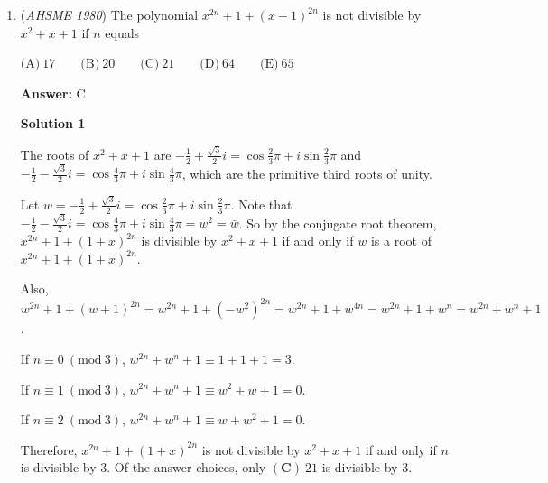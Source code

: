 \begin{enumerate}
 Then $x^3 = (y+z)^3 = y^3 + 3y^2z + 3yz^2 + z^3 = y^3 + z^3 + 3yz(y+z) = y^3 + z^3 + 3yzx$.

 Note that $y^3 + z^3 = 5 + 2\sqrt{13} + 5 - 2\sqrt{13} = 10$ and $yz = \sqrt[3]{\left(5 + 2\sqrt{13}\right)\left(5-2\sqrt{13}\right)} = \sqrt[3]{5^2 -\left(2\sqrt{13}\right)^2} = \sqrt[3]{-27} = -3$.

 So $x^3 = 10 + 3 \cdot -3 \cdot x = 10-9x$, that is $x^3+9x-10=0$.  This factors to $(x-1)(x^2+x+10) = 0$, which has $x=1$ as its only real solution.

 Therefore, $\sqrt[3] {5+2\sqrt{13}}+\sqrt[3]{5-2\sqrt{13}} = 1$ and the answer is $\boxed{(\textbf{E})\ \textrm{none of these}}$.

 


	\item (\textit{AHSME 1980}) The polynomial $x^{2n}+1+(x+1)^{2n}$ is not divisible by $x^2+x+1$ if $n$ equals 


 $\text{(A)} \ 17 \qquad  \text{(B)} \ 20 \qquad  \text{(C)} \ 21 \qquad  \text{(D)} \ 64 \qquad  \text{(E)} \ 65$

 \textbf{Answer: }C



\textbf{Solution 1}

The roots of $x^2+x+1$ are $-\frac{1}{2} + \frac{\sqrt{3}}{2}i = \cos\frac{2}{3}\pi + i \sin \frac{2}{3}\pi$ and $-\frac{1}{2} - \frac{\sqrt{3}}{2}i = \cos \frac{4}{3}\pi + i \sin\frac{4}{3}\pi$, which are the primitive third roots of unity.

 Let $w = -\frac{1}{2} + \frac{\sqrt{3}}{2}i = \cos\frac{2}{3}\pi + i \sin \frac{2}{3}\pi$.  Note that $-\frac{1}{2} - \frac{\sqrt{3}}{2}i = \cos \frac{4}{3}\pi + i \sin\frac{4}{3}\pi = w^2 = \bar{w}$.  So by the conjugate root theorem, $x^{2n} + 1 + (1+x)^{2n}$ is divisible by $x^2+x+1$ if and only if $w$ is a root of $x^{2n} + 1 + (1+x)^{2n}$.

 Also, $w^{2n} + 1 + (w+1)^{2n} = w^{2n} + 1 + (-w^2)^{2n} = w^{2n} + 1 + w^{4n} = w^{2n} + 1 + w^n = w^{2n} + w^n + 1$.

 If $n \equiv 0\ (\textrm{mod}\ 3)$, $w^{2n} + w^n + 1 \equiv 1 + 1 + 1 = 3$.

 If $n \equiv 1\ (\textrm{mod}\ 3)$, $w^{2n} + w^n + 1 \equiv w^2 + w + 1 = 0$.

 If $n \equiv 2\ (\textrm{mod}\ 3)$, $w^{2n} + w^n + 1 \equiv w + w^2 + 1 = 0$.

 Therefore, $x^{2n} + 1 + (1+x)^{2n}$ is not divisible by $x^2 + x + 1$ if and only if $n$ is divisible by $3$.  Of the answer choices, only $\boxed{(\textbf{C})\  21}$ is divisible by $3$.


\end{enumerate}
